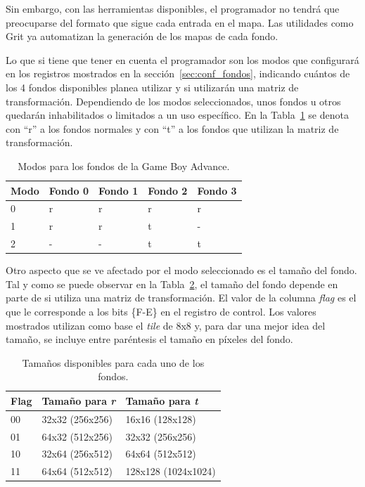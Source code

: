 Sin embargo, con las herramientas disponibles, el programador no tendrá que preocuparse del formato que sigue cada entrada en el mapa. Las utilidades como Grit ya automatizan la generación de los mapas de cada fondo.

Lo que si tiene que tener en cuenta el programador son los modos que configurará en los registros mostrados en la sección~\ref{sec:conf_fondos}, indicando cuántos de los 4 fondos disponibles planea utilizar y si utilizarán una matriz de transformación. Dependiendo de los modos seleccionados, unos fondos u otros quedarán inhabilitados o limitados a un uso específico. En la Tabla~\ref{tab:modos_fondos} se denota con ``r'' a los fondos normales y con ``t'' a los fondos que utilizan la matriz de transformación.

\begin{table}[h]
	\centering
	\begin{tabular}{| l | l | l | l | l |}
		\hline
		\textbf{Modo} & \textbf{Fondo 0} & \textbf{Fondo 1} & \textbf{Fondo 2} & \textbf{Fondo 3} \\ \hline
		0 & r & r & r & r \\ \hline
		1 & r & r & t  & - \\ \hline
		2 & - & - & t & t \\ \hline
	\end{tabular}
	\caption{Modos para los fondos de la Game Boy Advance.}
	\label{tab:modos_fondos}
\end{table}

Otro aspecto que se ve afectado por el modo seleccionado es el tamaño del fondo. Tal y como se puede observar en la Tabla~\ref{tab:size_bg}, el tamaño del fondo depende en parte de si utiliza una matriz de transformación. El valor de la columna \textit{flag} es el que le corresponde a los bits \{F-E\} en el registro de control. Los valores mostrados utilizan como base el \textit{tile} de 8x8 y, para dar una mejor idea del tamaño, se incluye entre paréntesis el tamaño en píxeles del fondo.

\begin{table}[h]
	\centering
	\begin{tabular}{| l | l | l |}
		\hline
		\textbf{Flag} & \textbf{Tamaño para \textit{r}} & \textbf{Tamaño para \textit{t}} \\ \hline
		00 & 32x32 (256x256) & 16x16 (128x128) \\ \hline
		01 & 64x32 (512x256) & 32x32 (256x256) \\ \hline
		10 & 32x64 (256x512) & 64x64 (512x512) \\ \hline
		11 & 64x64 (512x512) & 128x128 (1024x1024) \\ \hline
	\end{tabular}
	\caption{Tamaños disponibles para cada uno de los fondos.}
	\label{tab:size_bg}
\end{table}
\FloatBarrier{}

